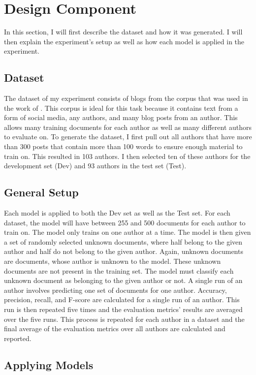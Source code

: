 \documentclass[11pt]{article}
\begin{document}
\section{Design Component}
In this section, I will first describe the dataset and how it was generated. I will then explain the experiment's setup as well as how each model is applied in the experiment.
\subsection{Dataset} \label{DATASET}

The dataset of my experiment consists of blogs from the corpus that was used in the work of \cite{schler2006effects}. This corpus is ideal for this task because it contains text from a form of social media, any authors, and many blog posts from an author. This allows many training documents for each author as well as many different authors to evaluate on. To generate the dataset, I first pull out all authors that have more than 300 posts that contain more than 100 words to ensure enough material to train on. This resulted in 103 authors. I then selected ten of these authors for the development set (Dev) and 93 authors in the test set (Test).

\subsection{General Setup}
Each model is applied to both the Dev set as well as the Test set. For each dataset, the model will have between 255 and 500 documents for each author to train on. The model only trains on one author at a time. The model is then given a set of randomly selected unknown documents, where half belong to the given author and half do not belong to the given author. Again, unknown documents are documents, whose author is unknown to the model. These unknown documents are not present in the training set. The model must classify each unknown document as belonging to the given author or not.  A single run of an author involves predicting one set of documents for one author. Accuracy, precision, recall, and F-score are calculated for a single run of an author. This run is then repeated five times and the evaluation metrics' results are averaged over the five runs. This process is repeated for each author in a dataset and the final average of the evaluation metrics over all authors are calculated and reported. 

\subsection{Applying Models}
\end{document}
